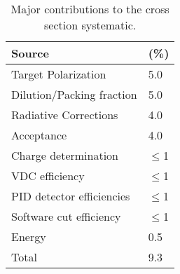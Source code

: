 \begin{table}
\begin{center}
  \begin{tabular}{ll} \hline\hline
 Source    &  (\%) \\
  \hline \hline
   Target Polarization                  & 5.0     \\
   Dilution/Packing fraction            & 5.0      \\
   Radiative Corrections                & 4.0     \\
   Acceptance                           & 4.0      \\
   Charge determination      & $\le$1      \\
   VDC efficiency            & $\le$1      \\
   PID detector efficiencies & $\le$1 \\
   Software cut efficiency   & $\le$1 \\
   Energy                    & 0.5      \\
 \hline\hline
    Total                    & 9.3  \\
 \end{tabular}
\caption{\label{sys} Major contributions to the cross section systematic.}
 \end{center}
\end{table}





